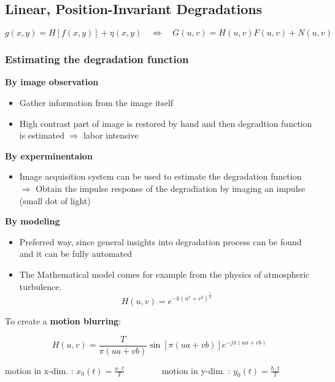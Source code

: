 	
\subsection{Linear, Position-Invariant Degradations}
	\[
		g(x,y) = H[f(x,y)] + \eta(x,y) \quad
		\Leftrightarrow \quad
		G(u,v) = H(u,v)F(u,v) + N(u,v)
	\]
	
\subsubsection{Estimating the degradation function }
\textbf{By image observation}
	\begin{itemize}
		\item Gather information from the image itself
		\item High contrast part of image is restored by hand and then degradtion function is estimated $\Rightarrow$ labor intensive
	\end{itemize}
\textbf{By experminentaion}
	\begin{itemize}
		\item Image acquisition system can be used to estimate the degradation function\\
		$\Rightarrow$ Obtain the impulse response of the degradiation by imaging an impulse (small dot of light)
	\end{itemize}

\textbf{By modeling}\\
	\begin{itemize}
		\item Preferred way, since general insights into degradation process can be found and it can be fully automated
		\item The Mathematical model comes for example from the physics of atmospheric turbulence. 
			\begin{equation}
				H(u,v) = e^{-k(u^2+v^2)^{\frac{5}{6}}}
			\end{equation}
	\end{itemize}


To create a \textbf{motion blurring}:

	\begin{equation}
		H(u,v) = \frac{T}{\pi (ua + vb)}\sin[\pi (ua + vb)] e^{-j \pi(ua + vb)}
	\end{equation}

	\begin{center}
		motion in x-dim. : $x_0(t) = \frac{a \cdot t}{T} \qquad \qquad$ 
		motion in y-dim. : $y_0(t) = \frac{b \cdot t}{T}$
	\end{center}

